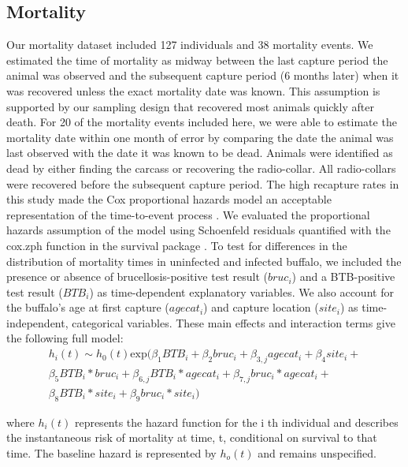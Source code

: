 \documentclass[11pt]{article}
\begin{document}
{\subsection*{Mortality}}
Our mortality dataset included 127 individuals and 38 mortality events. We estimated the time of mortality as midway between the last capture period the animal was observed and the subsequent capture period (6 months later) when it was recovered unless the exact mortality date was known. This assumption is supported by
our sampling design that recovered most animals quickly after death. For 20 of the mortality events included here, we were able to estimate the mortality date within one month of error by comparing the date the animal was last observed with the date it was known to be dead. Animals were identified as dead by either finding the carcass or recovering the radio-collar. All radio-collars were recovered before the subsequent capture period. The high recapture rates in this study made the Cox proportional hazards model an acceptable representation of the time-to-event process \cite{fisher_time-dependent_1999}. We evaluated the proportional hazards assumption of the model using Schoenfeld residuals \cite{grambsch_proportional_1994, fox_cox_2011} quantified with the cox.zph function in the survival package \cite{therneau_package_2014}.
To test for differences in the distribution of mortality times in uninfected and infected buffalo, we included the presence or absence of brucellosis-positive test result ($bruc_i$) and a BTB-positive test result ($BTB_i$) as time-dependent explanatory variables. We also account for the buffalo's age at first capture ($agecat_i$) and capture location ($site_i$) as time-independent, categorical variables. These main effects and interaction terms give the following full model:
\begin{gather*}
h_{i}(t) \sim h_{0}(t) \text{exp} (\beta_{1} BTB_i + \beta_{2} bruc_i + \beta_{3,j}agecat_i + \beta_4 site_i + \\
\beta_5 BTB_i * bruc_i + \beta_{6,j} BTB_i * agecat_i + \beta_{7,j} bruc_i * agecat_i + \\
 \beta_8 BTB_i * site_i + \beta_9 bruc_i * site_i)
\end{gather*}

where $h_{i}(t)$ represents the hazard function for the i th individual and describes the instantaneous risk of mortality at time, t, conditional on survival to that time. The baseline hazard is represented by $h_{o}(t)$ and remains unspecified.  
\end{document}

